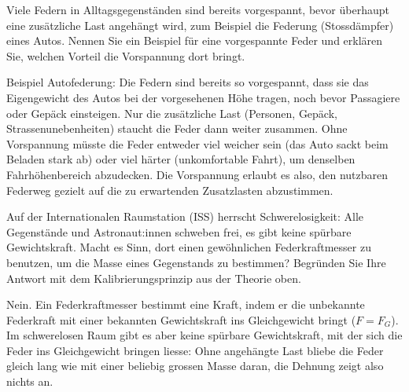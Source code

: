 \documentclass[addpoints,11pt,a4paper]{exam}
\newlength{\antwortraumlen}
\newcommand{\Antwortraum}[1]{%
  \pgfmathsetlength{\antwortraumlen}{#1*2.5cm}%
  \begin{answerbox}
    \rule{0pt}{\antwortraumlen}%
  \end{answerbox}%
}
\begin{document}
\begin{questions}
\setcounter{question}{3}
\begin{taskbox}
\question[3] Viele Federn in Alltagsgegenständen sind bereits vorgespannt,
bevor überhaupt eine zusätzliche Last angehängt wird, zum Beispiel die
Federung (Stossdämpfer) eines Autos. Nennen Sie ein Beispiel für eine
vorgespannte Feder und erklären Sie, welchen Vorteil die Vorspannung dort
bringt.
\Antwortraum{3}
\begin{solution}
Beispiel Autofederung: Die Federn sind bereits so vorgespannt, dass sie
das Eigengewicht des Autos bei der vorgesehenen Höhe tragen, noch bevor
Passagiere oder Gepäck einsteigen. Nur die zusätzliche Last (Personen,
Gepäck, Strassenunebenheiten) staucht die Feder dann weiter zusammen.
Ohne Vorspannung müsste die Feder entweder viel weicher sein (das Auto
sackt beim Beladen stark ab) oder viel härter (unkomfortable Fahrt), um
denselben Fahrhöhenbereich abzudecken. Die Vorspannung erlaubt es also,
den nutzbaren Federweg gezielt auf die zu erwartenden Zusatzlasten
abzustimmen.
\end{solution}
\end{taskbox}
\end{questions}

\begin{questions}
\setcounter{question}{4}
\begin{taskbox}
\question[2] Auf der Internationalen Raumstation (ISS) herrscht
Schwerelosigkeit: Alle Gegenstände und Astronaut:innen schweben frei, es
gibt keine spürbare Gewichtskraft. Macht es Sinn, dort einen gewöhnlichen
Federkraftmesser zu benutzen, um die Masse eines Gegenstands zu
bestimmen? Begründen Sie Ihre Antwort mit dem Kalibrierungsprinzip aus
der Theorie oben.
\Antwortraum{2}
\begin{solution}
Nein. Ein Federkraftmesser bestimmt eine Kraft, indem er die unbekannte
Federkraft mit einer bekannten Gewichtskraft ins Gleichgewicht bringt
($F=F_G$). Im schwerelosen Raum gibt es aber keine spürbare Gewichtskraft,
mit der sich die Feder ins Gleichgewicht bringen liesse: Ohne angehängte
Last bliebe die Feder gleich lang wie mit einer beliebig grossen Masse
daran, die Dehnung zeigt also nichts an.
\end{solution}
\end{taskbox}
\end{questions}
\end{document}

